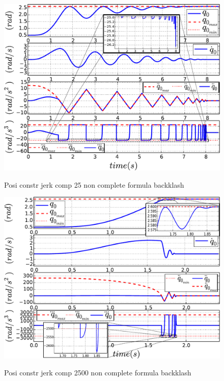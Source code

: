 \documentclass[a4paper, 10pt, conference]{ieeeconf}      %
\begin{document}
{{\begin{figure}[!htbp]
{\includegraphics[width=1.0\columnwidth]{figures/6_Posi_constr_jerk_comp_25_non_complete_formula_backklash}}
\caption{Posi constr jerk comp 25 non complete formula backklash} 
\label{fig:6_Posi_constr_jerk_comp_25_non_complete_formula_backklash}
\end{figure}
\begin{figure}[!htbp]
\centering
{\includegraphics[width=1.0\columnwidth]{figures/7_Posi_constr_jerk_comp_2500_non_complete_formula_backklash}}
\caption{Posi constr jerk comp 2500 non complete formula backklash} 
\label{fig:7_Posi_constr_jerk_comp_2500_non_complete_formula_backklash}
\end{figure}
\begin{figure}[!htbp]

\end{figure}}}
\end{document}
